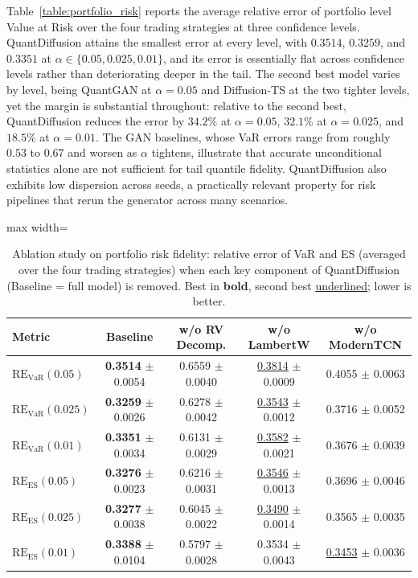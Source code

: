 \documentclass[sigconf,natbib=false]{acmart}
\begin{document}
Table~\ref{table:portfolio_risk} reports the average relative error of portfolio level Value at Risk over the four trading strategies at three confidence levels. QuantDiffusion attains the smallest error at every level, with $0.3514$, $0.3259$, and $0.3351$ at $\alpha \in \{0.05, 0.025, 0.01\}$, and its error is essentially flat across confidence levels rather than deteriorating deeper in the tail. The second best model varies by level, being QuantGAN at $\alpha = 0.05$ and Diffusion-TS at the two tighter levels, yet the margin is substantial throughout: relative to the second best, QuantDiffusion reduces the error by $34.2\%$ at $\alpha = 0.05$, $32.1\%$ at $\alpha = 0.025$, and $18.5\%$ at $\alpha = 0.01$. The GAN baselines, whose VaR errors range from roughly $0.53$ to $0.67$ and worsen as $\alpha$ tightens, illustrate that accurate unconditional statistics alone are not sufficient for tail quantile fidelity. QuantDiffusion also exhibits low dispersion across seeds, a practically relevant property for risk pipelines that rerun the generator across many scenarios.

\begin{table}[htbp]
\centering
\caption{Ablation study on portfolio risk fidelity: relative error of VaR and ES (averaged over the four trading strategies) when each key component of QuantDiffusion (Baseline = full model) is removed. Best in \textbf{bold}, second best \underline{underlined}; lower is better.}
\label{table:ablation_portfolio_risk}

\scriptsize
\setlength{\tabcolsep}{3pt}
\renewcommand{\arraystretch}{0.9}

\begin{adjustbox}{max width=\textwidth}
\begin{tabular}{l|cccc}
\toprule
\textbf{Metric} & \textbf{Baseline} & \textbf{w/o RV Decomp.} & \textbf{w/o LambertW} & \textbf{w/o ModernTCN} \\
\midrule
$\text{RE}_{\text{VaR}}(0.05)$
& \textbf{0.3514} $\pm$ 0.0054
& 0.6559 $\pm$ 0.0040
& \underline{0.3814} $\pm$ 0.0009
& 0.4055 $\pm$ 0.0063 \\
$\text{RE}_{\text{VaR}}(0.025)$
& \textbf{0.3259} $\pm$ 0.0026
& 0.6278 $\pm$ 0.0042
& \underline{0.3543} $\pm$ 0.0012
& 0.3716 $\pm$ 0.0052 \\
$\text{RE}_{\text{VaR}}(0.01)$
& \textbf{0.3351} $\pm$ 0.0034
& 0.6131 $\pm$ 0.0029
& \underline{0.3582} $\pm$ 0.0021
& 0.3676 $\pm$ 0.0039 \\
\midrule
$\text{RE}_{\text{ES}}(0.05)$
& \textbf{0.3276} $\pm$ 0.0023
& 0.6216 $\pm$ 0.0031
& \underline{0.3546} $\pm$ 0.0013
& 0.3696 $\pm$ 0.0046 \\
$\text{RE}_{\text{ES}}(0.025)$
& \textbf{0.3277} $\pm$ 0.0038
& 0.6045 $\pm$ 0.0022
& \underline{0.3490} $\pm$ 0.0014
& 0.3565 $\pm$ 0.0035 \\
$\text{RE}_{\text{ES}}(0.01)$
& \textbf{0.3388} $\pm$ 0.0104
& 0.5797 $\pm$ 0.0028
& 0.3534 $\pm$ 0.0043
& \underline{0.3453} $\pm$ 0.0036 \\
\bottomrule
\end{tabular}
\end{adjustbox}
\end{table}
\end{document}
